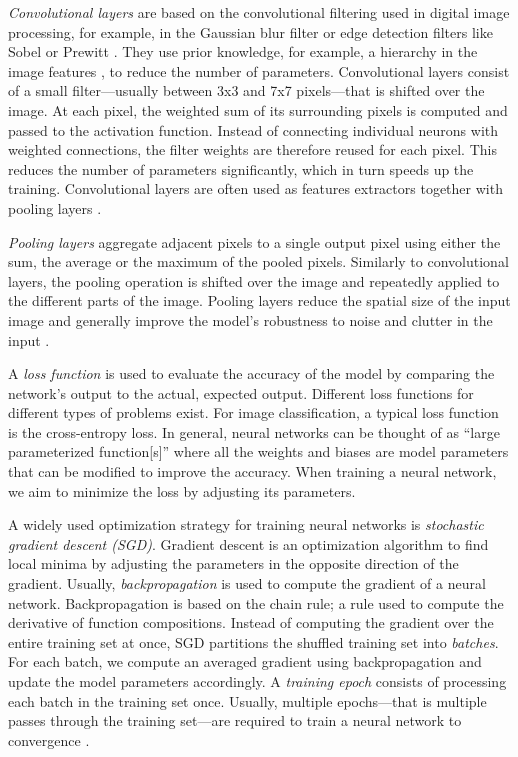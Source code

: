 \documentclass[conference,compsoc,a4paper]{IEEEtran}
\begin{document}
\emph{Convolutional layers} are based on the convolutional filtering used in digital image processing, for example, in the Gaussian blur filter or edge detection filters like Sobel or Prewitt \cite{Stockman:2001:CV:558008}.
They use prior knowledge, for example, a hierarchy in the image features \cite{lecun2010convolutional}, to reduce the number of parameters.
Convolutional layers consist of a small filter---usually between 3x3 and 7x7 pixels---that is shifted over the image.
At each pixel, the weighted sum of its surrounding pixels is computed and passed to the activation function.
Instead of connecting individual neurons with weighted connections, the filter weights are therefore reused for each pixel.
This reduces the number of parameters significantly, which in turn speeds up the training.
Convolutional layers are often used as features extractors together with pooling layers \cite{lecun2010convolutional}.

\emph{Pooling layers} aggregate adjacent pixels to a single output pixel using either the sum, the average or the maximum of the pooled pixels.
Similarly to convolutional layers, the pooling operation is shifted over the image and repeatedly applied to the different parts of the image.
Pooling layers reduce the spatial size of the input image and generally improve the model's robustness to noise and clutter in the input \cite{lecun2010convolutional,chilimbi2014-Project-Adam}.

A \emph{loss function} is used to evaluate the accuracy of the model by comparing the network's output to the actual, expected output.
Different loss functions for different types of problems exist.
For image classification, a typical loss function is the cross-entropy loss.
%
In general, neural networks can be thought of as ``large parameterized function[s]'' \cite{paine2013-GPU-async-SGD} where all the weights and biases are model parameters that can be modified to improve the accuracy.
When training a neural network, we aim to minimize the loss by adjusting its parameters.

A widely used optimization strategy for training neural networks is \emph{stochastic gradient descent (SGD)}. %
Gradient descent is an optimization algorithm to find local minima by adjusting the parameters in the opposite direction of the gradient.
%
Usually, \emph{backpropagation} is used to compute the gradient of a neural network.
Backpropagation is based on the chain rule; a rule used to compute the derivative of function compositions.
%
Instead of computing the gradient over the entire training set at once, SGD partitions the shuffled training set into \emph{batches}.
For each batch, we compute an averaged gradient using backpropagation and update the model parameters accordingly.
%
A \emph{training epoch} consists of processing each batch in the training set once.
Usually, multiple epochs---that is multiple passes through the training set---are required to train a neural network to convergence \cite{chilimbi2014-Project-Adam}.
\end{document}

